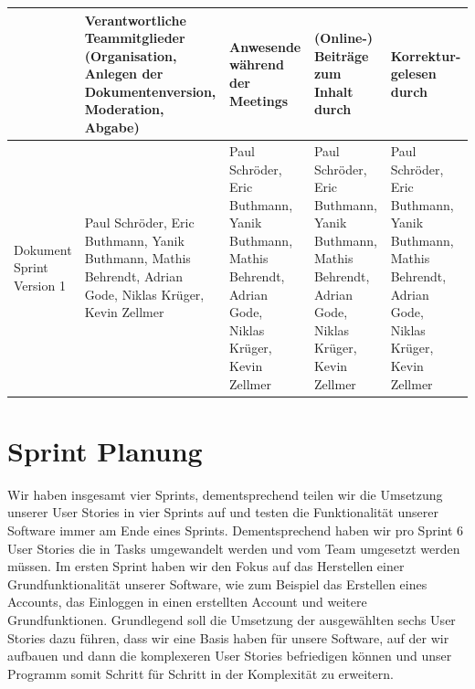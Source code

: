 \documentclass[a4paper,11pt]{article}
\begin{document}
\begin{table}[h]
		\centering
		\footnotesize
		\begin{tabular}{| p{1.5cm} | p{2.5cm} | p{2cm} | p{2cm} | p{2cm} |}
			\hline
			                           & Verantwortliche Teammitglieder (Organisation, Anlegen der Dokumentenversion, Moderation, Abgabe)                                   & Anwesende während der Meetings                                                                                                     & (Online-) Beiträge zum Inhalt durch                                                                                                & Korrektur-gelesen durch                                                                                                            \\
			\hline
			Dokument Sprint Version 1 & Paul Schröder, Eric Buthmann, Yanik Buthmann, Mathis Behrendt, Adrian Gode, Niklas Krüger, Kevin Zellmer & Paul Schröder, Eric Buthmann, Yanik Buthmann, Mathis Behrendt, Adrian Gode, Niklas Krüger, Kevin Zellmer & Paul Schröder, Eric Buthmann, Yanik Buthmann, Mathis Behrendt, Adrian Gode, Niklas Krüger, Kevin Zellmer & Paul Schröder, Eric Buthmann, Yanik Buthmann, Mathis Behrendt, Adrian Gode, Niklas Krüger, Kevin Zellmer \\
			\hline
		\end{tabular}
	\end{table}


\section{Sprint Planung}

Wir haben insgesamt vier Sprints, dementsprechend teilen wir die Umsetzung unserer User Stories in vier Sprints auf und testen die Funktionalität unserer Software immer am Ende eines Sprints. Dementsprechend haben wir pro Sprint 6 User Stories die in Tasks umgewandelt werden und vom Team umgesetzt werden müssen. Im ersten Sprint haben wir den Fokus auf das Herstellen einer Grundfunktionalität unserer Software, wie zum Beispiel das Erstellen eines Accounts, das Einloggen in einen erstellten Account und weitere Grundfunktionen. Grundlegend soll die Umsetzung der ausgewählten sechs User Stories dazu führen, dass wir eine Basis haben für unsere Software, auf der wir aufbauen und dann die komplexeren User Stories befriedigen können und unser Programm somit Schritt für Schritt in der Komplexität zu erweitern.
\end{document}
